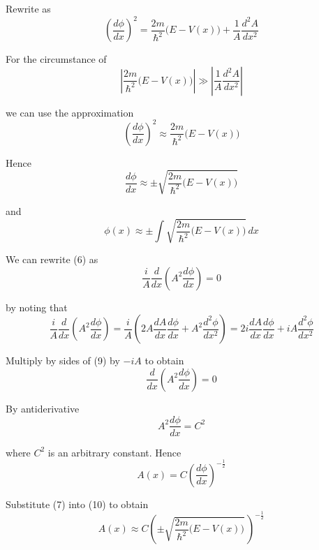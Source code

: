 Rewrite as
\begin{equation*}
\left(\frac{d\phi}{dx}\right)^2
=\frac{2m}{\hbar^2}\bigl(E-V(x)\bigr)+\frac{1}{A}\frac{d^2A}{dx^2}
\end{equation*}

For the circumstance of
\begin{equation*}
\left|\frac{2m}{\hbar^2}\bigl(E-V(x)\bigr)\right|
\gg
\left|\frac{1}{A}\frac{d^2A}{dx^2}\right|
\end{equation*}

we can use the approximation
\begin{equation*}
\left(\frac{d\phi}{dx}\right)^2\approx\frac{2m}{\hbar^2}\bigl(E-V(x)\bigr)
\end{equation*}

Hence
\begin{equation*}
\frac{d\phi}{dx}\approx\pm\sqrt{\frac{2m}{\hbar^2}\bigl(E-V(x)\bigr)}
\tag{7}
\end{equation*}

and
\begin{equation*}
\phi(x)\approx\pm\int\sqrt{\frac{2m}{\hbar^2}\bigl(E-V(x)\bigr)}\,dx
\tag{8}
\end{equation*}

We can rewrite (6) as
\begin{equation*}
\frac{i}{A}\frac{d}{dx}\left(A^2\frac{d\phi}{dx}\right)=0
\tag{9}
\end{equation*}

by noting that
\begin{equation*}
\frac{i}{A}\frac{d}{dx}\left(A^2\frac{d\phi}{dx}\right)
=\frac{i}{A}\left(2A\frac{dA}{dx}\frac{d\phi}{dx}+A^2\frac{d^2\phi}{dx^2}\right)
=2i\frac{dA}{dx}\frac{d\phi}{dx}+iA\frac{d^2\phi}{dx^2}
\end{equation*}

Multiply by sides of (9) by $-iA$ to obtain
\begin{equation*}
\frac{d}{dx}\left(A^2\frac{d\phi}{dx}\right)=0
\end{equation*}

By antiderivative
\begin{equation*}
A^2\frac{d\phi}{dx}=C^2
\end{equation*}

where $C^2$ is an arbitrary constant. Hence
\begin{equation*}
A(x)=C\left(\frac{d\phi}{dx}\right)^{-\frac{1}{2}}
\tag{10}
\end{equation*}

Substitute (7) into (10) to obtain
\begin{equation*}
A(x)\approx C
\left(\pm\sqrt{\frac{2m}{\hbar^2}\bigl(E-V(x)\bigr)}\,\right)^{-\frac{1}{2}}
\tag{11}
\end{equation*}

